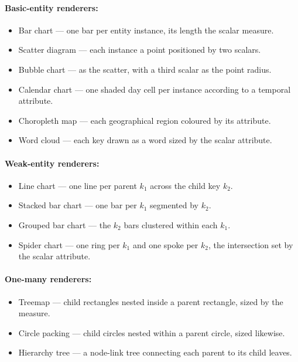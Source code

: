 \paragraph{Basic-entity renderers:}
\begin{itemize}
  \item Bar chart --- one bar per entity instance, its length the scalar measure.
  \item Scatter diagram --- each instance a point positioned by two scalars.
  \item Bubble chart --- as the scatter, with a third scalar as the point radius.
  \item Calendar chart --- one shaded day cell per instance according to a temporal attribute.
  \item Choropleth map --- each geographical region coloured by its attribute.
  \item Word cloud --- each key drawn as a word sized by the scalar attribute.
\end{itemize}

\paragraph{Weak-entity renderers:}
\begin{itemize}
  \item Line chart --- one line per parent $k_1$ across the child key $k_2$.
  \item Stacked bar chart --- one bar per $k_1$ segmented by $k_2$.
  \item Grouped bar chart --- the $k_2$ bars clustered within each $k_1$.
  \item Spider chart --- one ring per $k_1$ and one spoke per $k_2$, the intersection set by the scalar attribute.
\end{itemize}

\paragraph{One-many renderers:}
\begin{itemize}
  \item Treemap --- child rectangles nested inside a parent rectangle, sized by the measure.
  \item Circle packing --- child circles nested within a parent circle, sized likewise.
  \item Hierarchy tree --- a node-link tree connecting each parent to its child leaves.
\end{itemize}

